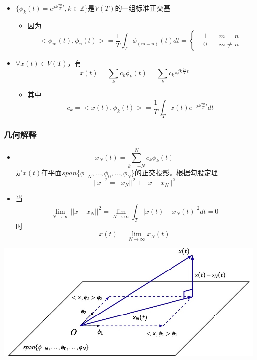 \documentclass[CJKutf8,xcolor=pdftex,dvipsnames,table]{beamer}
\begin{document}
\begin{CJK*}{UTF8}{song}
\begin{frame}
\begin{itemize}
	\item $\{\phi_k(t) = e^{jk\frac{2\pi}{T}t}, k \in \mathbb{Z}\}$是$V(T)$的一组标准正交基
		\begin{itemize}
		\item 因为
		\[
<\phi_m(t), \phi_n(t)>=\frac{1}{T}\int_T \phi_{(m-n)}(t)dt = 
\left\{
    \begin {aligned}
         & 1 \quad & m = n \\
         & 0 \quad & m \neq n                 
    \end{aligned}
\right.
		\]	
		\end{itemize}
		
	\item $\forall x(t) \in V(T)$，有
	\[
	x(t)=\sum_k c_k \phi_k(t) = \sum_k c_k e^{jk\frac{2\pi}{T}t}
	\]
		\begin{itemize}
		\item 其中
		\[
		c_k = <x(t), \phi_k(t)> = \frac{1}{T} \int_T x(t) e^{-jk\frac{2\pi}{T}t} dt
		\]
		\end{itemize}


	\end{itemize}

  \end{frame}  
  
  \begin{frame}
    \frametitle{几何解释}
    \begin{itemize}
    \item \[x_{N}(t)=\sum_{k=-N}^{N}c_k \phi_k(t) \]是$x(t)$在平面$span\{\phi_{-N}, \hdots, \phi_0, \hdots, \phi_N\}$的正交投影。根据勾股定理
    \[
    ||x||^2 = ||x_N||^2 + ||x-x_N||^2 
    \]
    \item 当\[ \lim_{N\to\infty}||x-x_N||^2=\lim_{N\to\infty}\int_{T}|x(t)-x_{N}(t)|^2dt = 0 \]时
    \[ x(t) = \lim_{N\to\infty} x_N(t) \]
    \end{itemize}
    \begin{center}
      \includegraphics[scale=.2]{msqgeo}
    \end{center}
  \end{frame}   


\end{CJK*}
\end{document}
